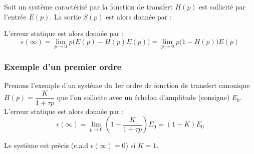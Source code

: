Soit un système caractérisé par la fonction de transfert $H(p)$ 
est sollicité par l'entrée $E(p)$. La sortie $S(p)$ est alors donnée par :

\begin{center}
\end{center}

L'erreur statique est alors donnée par :
$$
\epsilon(\infty)=\lim\limits_{p\to 0} p\big(E(p)-H(p)E(p)\big)
                =\lim\limits_{p\to 0} p\big(1-H(p)\big)E(p)
$$

\subsubsection{Exemple d'un premier ordre}

Prenons l'exemple d'un système du 1er ordre de fonction de transfert canonique 
$H(p)=\dfrac{K}{1+\tau p}$ que l'on sollicite avec un échelon 
d'amplitude (consigne) $E_0$.
L'erreur statique est alors donnée par :
$$
\epsilon(\infty)=\lim\limits_{p\to 0}\left(1-\dfrac{K}{1+\tau p}\right)E_0
                =(1-K)E_0
$$

Le système est prècis (c.a.d $\epsilon(\infty)=0$) si $K=1$. 




